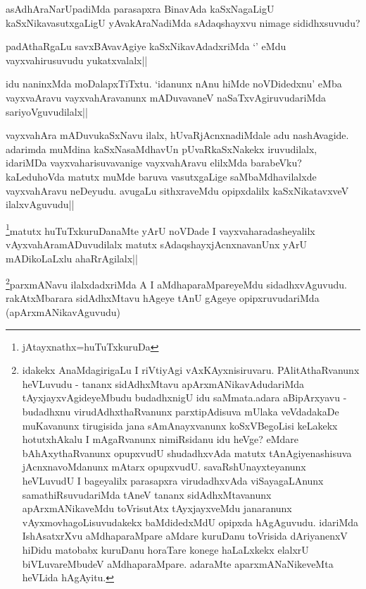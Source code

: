 \begin{artha}
asAdhAraNarUpadiMda parasapxra BinavAda kaSxNagaLigU kaSxNikavasutxgaLigU yAvakAraNadiMda sAdaqshayxvu nimage sididhxsuvudu? 
\end{artha}


\begin{artha}
padAthaRgaLu savxBAvavAgiye kaSxNikavAdadxriMda `\stext' eMdu vayxvahirusuvudu yukatxvalalx||
\end{artha}

\begin{artha}
idu naninxMda moDalapxTiTxtu. `idanunx nAnu hiMde noVDidedxnu' eMba vayxvaAravu vayxvahAravanunx mADuvavaneV naSaTxvAgiruvudariMda sariyoVguvudilalx||
\end{artha}

\begin{artha}
vayxvahAra mADuvukaSxNavu ilalx, hUvaRjAcnxnadiMdale adu nashAvagide. adarimda muMdina kaSxNasaMdhavUn pUvaRkaSxNakekx iruvudilalx, idariMDa vayxvaharisuvavanige vayxvahAravu elilxMda barabeVku? kaLeduhoVda matutx muMde baruva vasutxgaLige saMbaMdhavilalxde vayxvahAravu neDeyudu. avugaLu sithxraveMdu opipxdalilx kaSxNikatavxveV ilalxvAguvudu||
\end{artha}
\begin{artha}
\footnote{jAtayxnathx=huTuTxkuruDa}matutx huTuTxkuruDanaMte yArU noVDade I vayxvaharadasheyalilx vAyxvahAramADuvudilalx matutx sAdaqshayxjAcnxnavanUnx yArU mADikoLaLxlu ahaRrAgilalx||
\end{artha}

\begin{artha}
\footnote{idakekx AnaMdagirigaLu I riVtiyAgi vAxKAyxnisiruvaru. PAlitAthaRvanunx heVLuvudu - tananx sidAdhxMtavu apArxmANikavAdudariMda tAyxjayxvAgideyeMbudu budadhxnigU idu saMmata.adara aBipArxyavu - budadhxnu virudAdhxthaRvanunx parxtipAdisuva mUlaka veVdadakaDe muKavanunx tirugisida jana sAmAnayxvanunx koSxVBegoLisi keLakekx hotutxhAkalu I mAgaRvanunx nimiRsidanu idu heVge? eMdare bAhAxythaRvanunx opupxvudU shudadhxvAda matutx tAnAgiyenashisuva jAcnxnavoMdanunx mAtarx opupxvudU. savaRshUnayxteyanunx heVLuvudU I bageyalilx parasapxra virudadhxvAda viSayagaLAnunx samathiRsuvudariMda tAneV tananx sidAdhxMtavanunx apArxmANikaveMdu toVrisutAtx tAyxjayxveMdu janaranunx vAyxmovhagoLisuvudakekx baMdidedxMdU opipxda hAgAguvudu. idariMda IshAsatxrXvu aMdhaparaMpare aMdare kuruDanu toVrisida dAriyanenxV hiDidu matobabx kuruDanu horaTare konege haLaLxkekx elalxrU biVLuvareMbudeV aMdhaparaMpare. adaraMte aparxmANaNikeveMta heVLida hAgAyitu.}parxmANavu ilalxdadxriMda A I  aMdhaparaMpareyeMdu sidadhxvAguvudu. rakAtxMbarara sidAdhxMtavu hAgeye tAnU gAgeye opipxruvudariMda (apArxmANikavAguvudu)
\end{artha}


